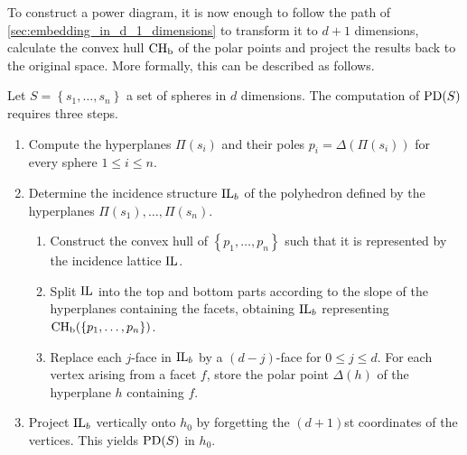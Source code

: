 To construct a power diagram, it is now enough to follow the path of \cref{sec:embedding_in_d_1_dimensions} to transform it to $d+1$ dimensions, calculate the convex hull $\operatorname{CH_b}$ of the polar points and project the results back to the original space.
More formally, this can be described as follows.

\begin{algorithm}
    \label{alg:embedding}
    Let $S = \left\{ s_1, \dots, s_n \right\}$ a set of spheres in $d$ dimensions.
    The computation of $\operatorname{PD}(S)$ requires three steps.
    \begin{enumerate}[label=Step \arabic*.,ref=Step \arabic*,leftmargin=5em]
        \item \label{alg:pd:step1} Compute the hyperplanes $\Pi(s_i)$ and their poles $p_i = \Delta(\Pi(s_i))$ for every sphere $1 \leq i \leq n$.
        \item \label{alg:pd:step2} Determine the incidence structure $\operatorname{IL}_b$ of the polyhedron defined by the hyperplanes $\Pi(s_1), \dots, \Pi(s_n)$.
            \begin{enumerate}[label*=\arabic*.,ref=\theenumi.\arabic*]
                \item \label{alg:pd:step21} Construct the convex hull of $\left\{ p_1, \dots, p_n \right\}$ such that it is represented by the incidence lattice $\operatorname{IL}$.
                \item \label{alg:pd:step22} Split $\operatorname{IL}$ into the top and bottom parts according to the slope of the hyperplanes containing the facets, obtaining $\operatorname{IL}_b$ representing $\operatorname{CH_b}(\left\{ p_1, \dots, p_n \right\})$.
                \item \label{alg:pd:step23} Replace each $j$-face in $\operatorname{IL}_b$ by a $(d - j)$-face for $0 \leq j \leq d$. For each vertex arising from a facet $f$, store the polar point $\Delta(h)$ of the hyperplane $h$ containing $f$.
            \end{enumerate}
        \item \label{alg:pd:step3} Project $\operatorname{IL}_b$ vertically onto $h_0$ by forgetting the $(d+1)$st coordinates of the vertices. This yields $\operatorname{PD}(S)$ in $h_0$.
    \end{enumerate}
\end{algorithm}

